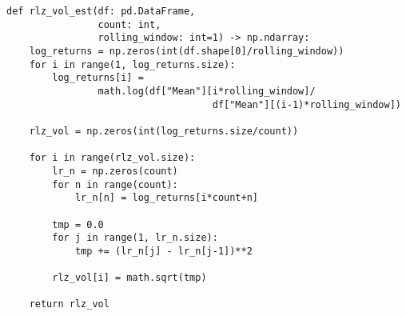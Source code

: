 \begin{verbatim}
def rlz_vol_est(df: pd.DataFrame, 
                count: int, 
                rolling_window: int=1) -> np.ndarray:
    log_returns = np.zeros(int(df.shape[0]/rolling_window))
    for i in range(1, log_returns.size):
        log_returns[i] = 
                math.log(df["Mean"][i*rolling_window]/
                                    df["Mean"][(i-1)*rolling_window])

    rlz_vol = np.zeros(int(log_returns.size/count))

    for i in range(rlz_vol.size):
        lr_n = np.zeros(count)
        for n in range(count):
            lr_n[n] = log_returns[i*count+n]

        tmp = 0.0
        for j in range(1, lr_n.size):
            tmp += (lr_n[j] - lr_n[j-1])**2

        rlz_vol[i] = math.sqrt(tmp)

    return rlz_vol
\end{verbatim}